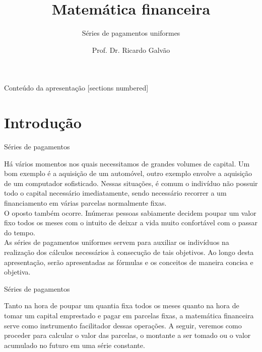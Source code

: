 \documentclass[10pt]{beamer}
\title{Matemática financeira}
\subtitle{Séries de pagamentos uniformes}
\date{}
\author{Prof. Dr. Ricardo Galvão}
\institute{www.rgalvao.com}
\begin{document}
\maketitle

\begin{frame}{Conteúdo da apresentação}
  [sections numbered]
  \tableofcontents[hideallsubsections]
\end{frame}

\section{Introdução}

\begin{frame}[fragile]{Séries de pagamentos}

Há vários momentos nos quais necessitamos de grandes volumes de capital. Um bom exemplo é a aquisição de um automóvel, outro exemplo envolve a aquisição de um computador sofisticado. Nessas situações, é comum o indivíduo não possuir todo o capital necessário imediatamente, sendo necessário recorrer a um financiamento em várias parcelas normalmente fixas.\\
O oposto também ocorre. Inúmeras pessoas sabiamente decidem poupar um valor fixo todos os meses com o intuito de deixar a vida muito confortável com o passar do tempo.\\
As séries de pagamentos uniformes servem para auxiliar os indivíduos na realização dos cálculos necessários à consecução de tais objetivos. Ao longo desta apresentação, serão apresentadas as fórmulas e os conceitos de maneira concisa e objetiva.

\end{frame}

\begin{frame}[fragile]{Séries de pagamentos}

Tanto na hora de poupar um quantia fixa todos os meses quanto na hora de tomar um capital emprestado e pagar em parcelas fixas, a matemática financeira serve como instrumento facilitador dessas operações. A seguir, veremos como proceder para calcular o valor das parcelas, o montante a ser tomado ou o valor acumulado no futuro em uma série constante.

\end{frame}


\end{document}
